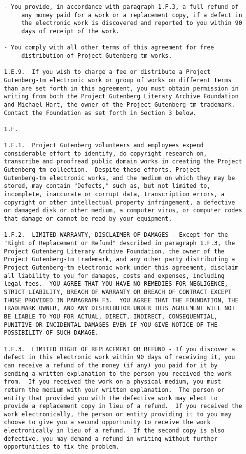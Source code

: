 \documentclass[oneside,12pt]{book}
\begin{document}
\begin{verbatim}
- You provide, in accordance with paragraph 1.F.3, a full refund of
     any money paid for a work or a replacement copy, if a defect in
     the electronic work is discovered and reported to you within 90
     days of receipt of the work.

- You comply with all other terms of this agreement for free
     distribution of Project Gutenberg-tm works.

1.E.9.  If you wish to charge a fee or distribute a Project
Gutenberg-tm electronic work or group of works on different terms
than are set forth in this agreement, you must obtain permission in
writing from both the Project Gutenberg Literary Archive Foundation
and Michael Hart, the owner of the Project Gutenberg-tm trademark.
Contact the Foundation as set forth in Section 3 below.

1.F.

1.F.1.  Project Gutenberg volunteers and employees expend
considerable effort to identify, do copyright research on,
transcribe and proofread public domain works in creating the Project
Gutenberg-tm collection.  Despite these efforts, Project
Gutenberg-tm electronic works, and the medium on which they may be
stored, may contain "Defects," such as, but not limited to,
incomplete, inaccurate or corrupt data, transcription errors, a
copyright or other intellectual property infringement, a defective
or damaged disk or other medium, a computer virus, or computer codes
that damage or cannot be read by your equipment.

1.F.2.  LIMITED WARRANTY, DISCLAIMER OF DAMAGES - Except for the
"Right of Replacement or Refund" described in paragraph 1.F.3, the
Project Gutenberg Literary Archive Foundation, the owner of the
Project Gutenberg-tm trademark, and any other party distributing a
Project Gutenberg-tm electronic work under this agreement, disclaim
all liability to you for damages, costs and expenses, including
legal fees.  YOU AGREE THAT YOU HAVE NO REMEDIES FOR NEGLIGENCE,
STRICT LIABILITY, BREACH OF WARRANTY OR BREACH OF CONTRACT EXCEPT
THOSE PROVIDED IN PARAGRAPH F3.  YOU AGREE THAT THE FOUNDATION, THE
TRADEMARK OWNER, AND ANY DISTRIBUTOR UNDER THIS AGREEMENT WILL NOT
BE LIABLE TO YOU FOR ACTUAL, DIRECT, INDIRECT, CONSEQUENTIAL,
PUNITIVE OR INCIDENTAL DAMAGES EVEN IF YOU GIVE NOTICE OF THE
POSSIBILITY OF SUCH DAMAGE.

1.F.3.  LIMITED RIGHT OF REPLACEMENT OR REFUND - If you discover a
defect in this electronic work within 90 days of receiving it, you
can receive a refund of the money (if any) you paid for it by
sending a written explanation to the person you received the work
from.  If you received the work on a physical medium, you must
return the medium with your written explanation.  The person or
entity that provided you with the defective work may elect to
provide a replacement copy in lieu of a refund.  If you received the
work electronically, the person or entity providing it to you may
choose to give you a second opportunity to receive the work
electronically in lieu of a refund.  If the second copy is also
defective, you may demand a refund in writing without further
opportunities to fix the problem.


\end{verbatim}
\end{document}
